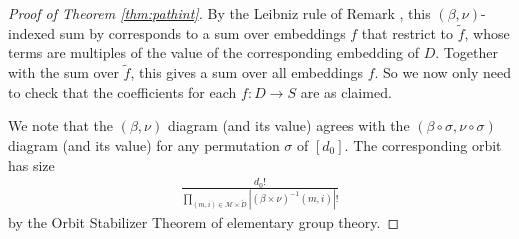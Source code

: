 \documentclass[openany, notitlepage, justified]{tufte-book}
\theoremstyle{plain}
\theoremstyle{definition}
\newcommand{\wabs}[1]{\left|#1\right|}
\newcommand{\Mm}{\mathcal{M}}
\begin{document}
\begin{proof}[Proof of Theorem \ref{thm:pathint}]
            By the Leibniz rule of Remark \label{rmk:leibniz}, this $(\beta,
            \nu)$-indexed sum by corresponds to a sum over embeddings $f$ that
            restrict to $\tilde f$, whose terms are multiples of the value of
            the corresponding embedding of $D$.  Together with the sum over
            $\tilde f$, this gives a sum over all embeddings $f$.  So we now
            only need to check that the coefficients for each $f:D\to S$ are as
            claimed.

            We note that the $(\beta, \nu)$ diagram (and its value) agrees with
            the $(\beta \circ \sigma, \nu \circ \sigma)$ diagram (and its
            value) for any permutation $\sigma$ of $[d_0]$.  The corresponding
            orbit has size
            \begin{align*}
                \frac{d_0!}{
                    \prod_{(m, i) \in \Mm \times \tilde D}
                        \wabs{(\beta \times \nu)^{-1}(m, i)}!
                }
            \end{align*}
            by the Orbit Stabilizer Theorem of elementary group theory.   


\end{proof}
\end{document}
